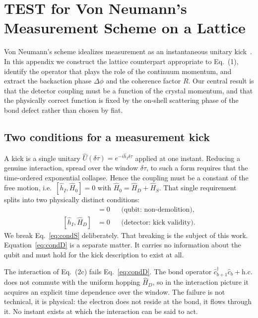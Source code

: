 \documentclass[10pt,
 amsmath,amssymb,
 aps,prb, twocolumn
]{revtex4-2}
\begin{document}
\section{TEST for Von Neumann's Measurement Scheme on a Lattice}
\label{app:vn}

Von Neumann's scheme idealizes measurement as an instantaneous unitary
kick~\cite{VonNeumann}. In this appendix we construct the lattice
counterpart appropriate to Eq.~(1), identify the operator that plays the
role of the continuum momentum, and extract the backaction phase
$\Delta\phi$ and the coherence factor $R$. Our central result is that the
detector coupling must be a function of the crystal momentum, and that the
physically correct function is fixed by the on-shell scattering phase of the
bond defect rather than chosen by fiat.

\subsection{Two conditions for a measurement kick}
\label{app:vn:conditions}

A kick is a single unitary $\hat U(\delta\tau)=e^{-i\hat h_I\delta\tau}$
applied at one instant. Reducing a genuine interaction, spread over the
window $\delta\tau$, to such a form requires that the time-ordered
exponential collapse. Hence the coupling must be a constant of the free
motion, i.e.\ $[\hat h_I,\hat H_0]=0$ with $\hat H_0=\hat H_D+\hat H_S$.
That single requirement splits into two physically distinct conditions:
\begin{align}
[\hat h_I,\hat H_S] &= 0 &&\text{(qubit: non-demolition)}, \label{eq:condS}\\
[\hat h_I,\hat H_D] &= 0 &&\text{(detector: kick validity)}. \label{eq:condD}
\end{align}
We break Eq.~\eqref{eq:condS} deliberately. That breaking is the subject of
this work. Equation~\eqref{eq:condD} is a separate matter. It carries no
information about the qubit and must hold for the kick description to exist
at all.

The interaction of Eq.~(2c) fails Eq.~\eqref{eq:condD}. The bond operator
$\hat c^{\dagger}_{b+1}\hat c_b+\mathrm{h.c.}$ does not commute with the
uniform hopping $\hat H_D$, so in the interaction picture it acquires an
explicit time dependence over the window. The failure is not technical, it
is physical: the electron does not reside at the bond, it flows through it.
No instant exists at which the interaction can be said to act.
\end{document}
